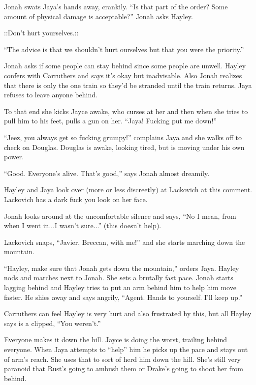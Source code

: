 Jonah swats Jaya's hands away, crankily.   ``Is that part of the order?  Some amount of physical damage is acceptable?'' Jonah asks Hayley.

 {\color[RGB]{153,0,255}::Don't hurt yourselves.:: } 

``The advice is that we shouldn't hurt ourselves but that you were the priority.''

Jonah asks if some people can stay behind since some people are unwell.  Hayley confers with Carruthers and says it's okay but inadvisable.  Also Jonah realizes that there is only the one train so they'd be stranded until the train returns. Jaya refuses to leave anyone behind.



To that end she kicks Jayce awake, who curses at her and then when she tries to pull him to his feet, pulls a gun on her. ``Jaya!  Fucking put me down!''

``Jeez, you always get so fucking grumpy!'' complains Jaya and she walks off to check on Douglas.  Douglas is awake, looking tired, but is moving under his own power.



``Good.  Everyone's alive.  That's good,'' says Jonah almost dreamily.

Hayley and Jaya look over (more or less discreetly) at Lackovich at this comment.  Lackovich has a dark fuck you look on her face.

Jonah looks around at the uncomfortable silence and says, ``No I mean, from when I went in...I wasn't sure...'' (this doesn't help).  

Lackovich snaps, ``Javier, Breccan, with me!'' and she starts marching down the mountain.



``Hayley, make sure that Jonah gets down the mountain,'' orders Jaya.  Hayley nods and marches next to Jonah.  She sets a brutally fast pace.  Jonah starts lagging behind and Hayley tries to put an arm behind him to help him move faster.  He shies away and says angrily, ``Agent.  Hands to yourself.  I'll keep up.''

Carruthers can feel Hayley is very hurt and also frustrated by this, but all Hayley says is a clipped, ``You weren't.''



Everyone makes it down the hill.  Jayce is doing the worst, trailing behind everyone.  When Jaya attempts to ``help'' him he picks up the pace and stays out of arm's reach.  She uses that to sort of herd him down the hill.  She's still very paranoid that Rust's going to ambush them or Drake's going to shoot her from behind.



